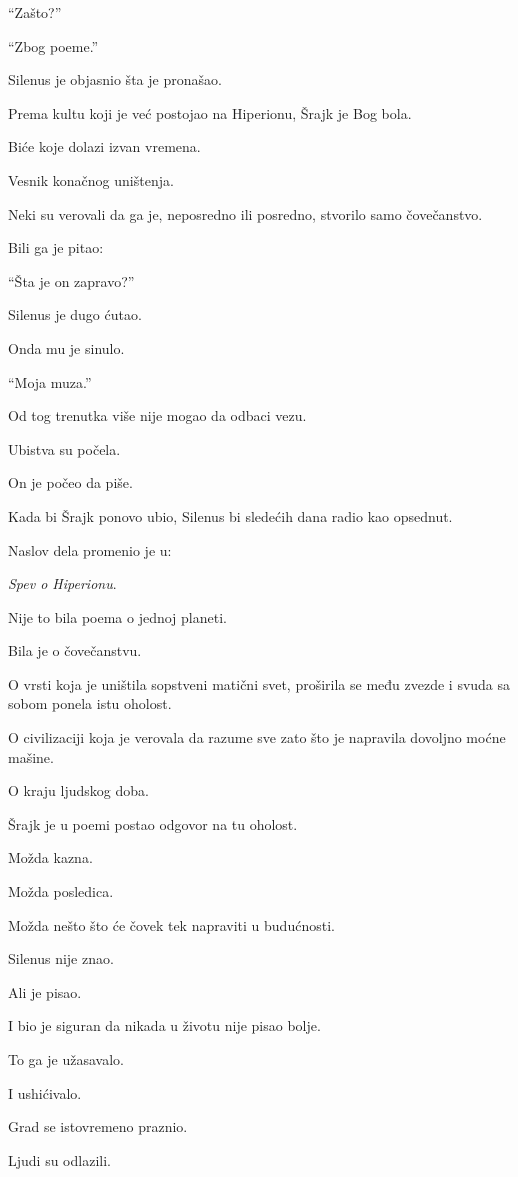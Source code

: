 ``Zašto?''

``Zbog poeme.''

Silenus je objasnio šta je pronašao.

Prema kultu koji je već postojao na Hiperionu, Šrajk je Bog bola.

Biće koje dolazi izvan vremena.

Vesnik konačnog uništenja.

Neki su verovali da ga je, neposredno ili posredno, stvorilo samo čovečanstvo.

Bili ga je pitao:

``Šta je on zapravo?''

Silenus je dugo ćutao.

Onda mu je sinulo.

``Moja muza.''

\bigskip

Od tog trenutka više nije mogao da odbaci vezu.

Ubistva su počela.

On je počeo da piše.

Kada bi Šrajk ponovo ubio, Silenus bi sledećih dana radio kao opsednut.

Naslov dela promenio je u:

\emph{Spev o Hiperionu}.

Nije to bila poema o jednoj planeti.

Bila je o čovečanstvu.

O vrsti koja je uništila sopstveni matični svet, proširila se među zvezde i svuda sa sobom ponela istu oholost.

O civilizaciji koja je verovala da razume sve zato što je napravila dovoljno moćne mašine.

O kraju ljudskog doba.

Šrajk je u poemi postao odgovor na tu oholost.

Možda kazna.

Možda posledica.

Možda nešto što će čovek tek napraviti u budućnosti.

Silenus nije znao.

Ali je pisao.

I bio je siguran da nikada u životu nije pisao bolje.

To ga je užasavalo.

I ushićivalo.

Grad se istovremeno praznio.

Ljudi su odlazili.

